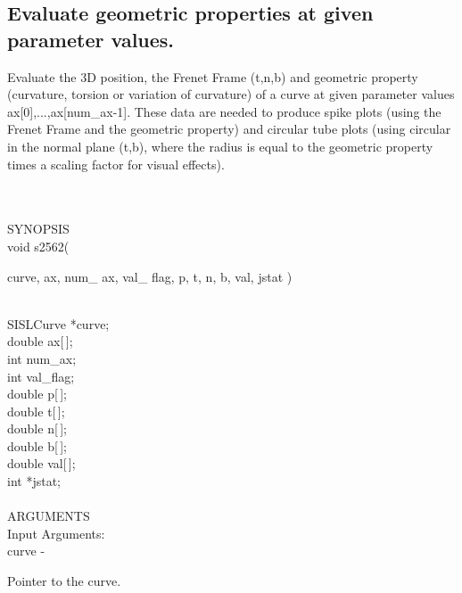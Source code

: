 \subsection{Evaluate geometric properties at given parameter values.}
\begin{minipg1}
Evaluate the 3D position, the Frenet Frame (t,n,b) and
               geometric property (curvature, torsion or variation of
               curvature) of a curve at given parameter values
               ax[0],...,ax[num\_ax-1].
               These data are needed to produce spike plots (using the
               Frenet Frame and the geometric property) and circular
               tube plots (using circular in the normal plane (t,b),
               where the radius is equal to the geometric property times
               a scaling factor for visual effects).
\end{minipg1} \\ \\
SYNOPSIS\\
        \> void s2562(\begin{minipg3}
             {\fov curve},  {\fov ax}, num\_ {\fov ax}, val\_ {\fov flag},  {\fov p},  {\fov t},  {\fov n},  {\fov b},  {\fov val}, jstat )
                \end{minipg3}\\
                \>\>    SISLCurve    \>  *{\fov curve};\\
                \>\>    double    \>  {\fov ax}[\,];\\
                \>\>    int    \>  {\fov num}\_ax;\\
                \>\>    int    \>  {\fov val}\_flag;\\
                \>\>    double    \>  {\fov p}[\,];\\
                \>\>    double    \>  {\fov t}[\,];\\
                \>\>    double    \>  {\fov n}[\,];\\
                \>\>    double    \>  {\fov b}[\,];\\
                \>\>    double    \>  {\fov val}[\,];\\
                \>\>    int    \>  *{\fov jstat};\\
\\
ARGUMENTS\\
	\>Input Arguments:\\
        \>\>    {\fov curve}\> - \>  \begin{minipg2}
                     Pointer to the curve.
                               \end{minipg2}\\
